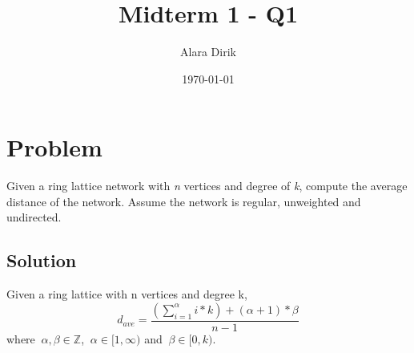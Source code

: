 \documentclass{article}
\title{Midterm 1 - Q1}
\author{Alara Dirik}
\date\today
\begin{document}
\maketitle 

\section*{Problem}
Given a ring lattice network with {\it n} vertices and degree of {\it k}, compute the average distance of the network. Assume the network is regular, unweighted and undirected.

\subsection*{Solution}
Given a ring lattice with n vertices and degree k, 
\[
d_{ave} = \frac{(\sum\limits_{i=1}^\alpha i*k) + (\alpha + 1) * \beta}{n-1}
\]
where $\ \alpha, \beta \in \mathbb{Z}$, $\ \alpha \in [1, \infty)$ and $\ \beta \in [0, k)$.
\end{document}
